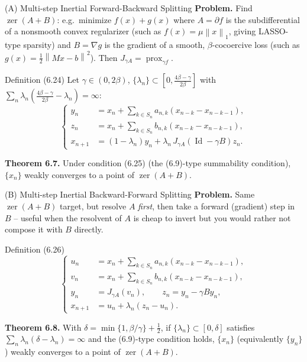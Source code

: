 \documentclass[aspectratio=169,10pt]{beamer}
\newcommand{\norm}[1]{\left\|#1\right\|}
\newcommand{\zer}{\operatorname{zer}}
\newcommand{\Id}{\operatorname{Id}}
\begin{document}
\begin{frame}{(A) Multi-step Inertial Forward-Backward Splitting}
\textbf{Problem.} Find $\zer(A+B)$: e.g.\ minimize $f(x)+g(x)$ where
$A=\partial f$ is the subdifferential of a nonsmooth convex regularizer
(such as $f(x)=\mu\norm{x}_1$, giving LASSO-type sparsity) and
$B=\nabla g$ is the gradient of a smooth, $\beta$-cocoercive loss (such as
$g(x)=\tfrac12\norm{Mx-b}^2$). Then $J_{\gamma A}=\operatorname{prox}_{\gamma f}$.

\begin{block}{Definition (6.24)}
Let $\gamma\in(0,2\beta)$, $\{\lambda_n\}\subset[0,\tfrac{4\beta-\gamma}{2\beta}]$
with $\sum_n\lambda_n(\tfrac{4\beta-\gamma}{2\beta}-\lambda_n)=\infty$:
\[
\left\{
\begin{aligned}
y_n &= x_n + \sum_{k\in S_n} a_{n,k}(x_{n-k}-x_{n-k-1}), \\
z_n &= x_n + \sum_{k\in S_n} b_{n,k}(x_{n-k}-x_{n-k-1}), \\
x_{n+1} &= (1-\lambda_n) y_n + \lambda_n\, J_{\gamma A}(\Id-\gamma B)z_n.
\end{aligned}
\right.
\]
\end{block}
\textbf{Theorem 6.7.} Under condition (6.25) (the (6.9)-type summability
condition), $\{x_n\}$ weakly converges to a point of $\zer(A+B)$.
\end{frame}

\begin{frame}{(B) Multi-step Inertial Backward-Forward Splitting}
\textbf{Problem.} Same $\zer(A+B)$ target, but resolve $A$ \emph{first},
then take a forward (gradient) step in $B$ -- useful when the resolvent of
$A$ is cheap to invert but you would rather not compose it with $B$
directly.
\begin{block}{Definition (6.26)}
\[
\left\{
\begin{aligned}
u_n &= x_n + \sum_{k\in S_n} a_{n,k}(x_{n-k}-x_{n-k-1}), \\
v_n &= x_n + \sum_{k\in S_n} b_{n,k}(x_{n-k}-x_{n-k-1}), \\
y_n &= J_{\gamma A}(v_n), \qquad z_n = y_n - \gamma B y_n, \\
x_{n+1} &= u_n + \lambda_n(z_n-u_n).
\end{aligned}
\right.
\]
\end{block}
\textbf{Theorem 6.8.} With $\delta=\min\{1,\beta/\gamma\}+\tfrac12$, if
$\{\lambda_n\}\subset[0,\delta]$ satisfies $\sum_n\lambda_n(\delta-\lambda_n)=\infty$
and the (6.9)-type condition holds, $\{x_n\}$ (equivalently $\{y_n\}$)
weakly converges to a point of $\zer(A+B)$.
\end{frame}
\end{document}
